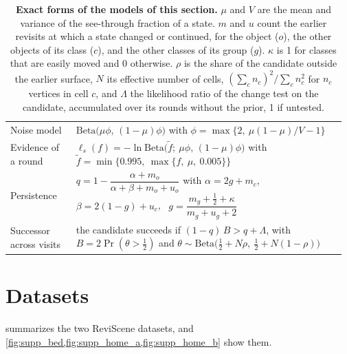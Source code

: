 \documentclass[10pt,onecolumn,letterpaper]{article}
\begin{document}
\begin{table}[H]
\centering
\small
\begin{tabular}{@{}p{0.19\linewidth}p{0.78\linewidth}@{}}
\toprule
Noise model & $\mathrm{Beta}\bigl(\mu\phi,\,(1-\mu)\phi\bigr)$ with $\phi=\max\{2,\ \mu(1-\mu)/V-1\}$ \\
Evidence of a round & $\ell_s(f)=-\ln\mathrm{Beta}\bigl(\tilde f;\ \mu\phi,\,(1-\mu)\phi\bigr)$ with $\tilde f=\min\{0.995,\ \max\{f,\ \mu,\ 0.005\}\}$ \\ \addlinespace[4pt]
Persistence & $q=1-\dfrac{\alpha+m_o}{\alpha+\beta+m_o+u_o}$ with $\alpha=2g+m_c$, \ $\beta=2(1-g)+u_c$, \ $g=\dfrac{m_g+\frac12+\kappa}{m_g+u_g+2}$ \\ \addlinespace[4pt]
Successor across visits & the candidate succeeds if $(1-q)\,B>q+\Lambda$, with $B=2\Pr(\theta>\tfrac12)$ and $\theta\sim\mathrm{Beta}\bigl(\tfrac12+N\rho,\ \tfrac12+N(1-\rho)\bigr)$ \\
\bottomrule
\end{tabular}
\caption{\textbf{Exact forms of the models of this section.} $\mu$ and $V$ are the mean and variance of the see-through fraction of a state. $m$ and $u$ count the earlier revisits at which a state changed or continued, for the object ($o$), the other objects of its class ($c$), and the other classes of its group ($g$). $\kappa$ is 1 for classes that are easily moved and 0 otherwise. $\rho$ is the share of the candidate outside the earlier surface, $N$ its effective number of cells, $(\sum_c n_c)^2/\sum_c n_c^2$ for $n_c$ vertices in cell $c$, and $\Lambda$ the likelihood ratio of the change test on the candidate, accumulated over its rounds without the prior, 1 if untested.}
\label{tab:supp_forms}
\vspace{-2mm}
\end{table}

\section{Datasets}
\label{sec:supp_datasets}

 summarizes the two ReviScene datasets, and \cref{fig:supp_bed,fig:supp_home_a,fig:supp_home_b} show them.
\end{document}
